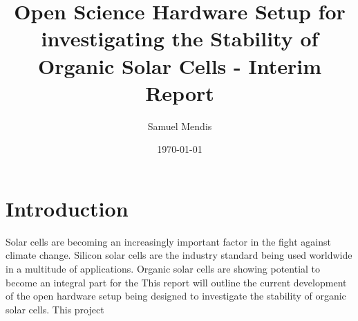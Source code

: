 \documentclass[a4paper,11pt]{article}
\begin{document}
\title{Open Science Hardware Setup for investigating the Stability of Organic Solar Cells - Interim Report}
\author{Samuel Mendis}
\date{\today}
\maketitle
\pagebreak
\section{Introduction}
Solar cells are becoming an increasingly important factor in the fight against climate change. Silicon solar cells are the industry standard being used worldwide in a multitude of applications. Organic solar cells are showing potential to become an integral part for the  This report will outline the current development of the open hardware setup being designed to investigate the stability of organic solar cells. This project 
\end{document}
